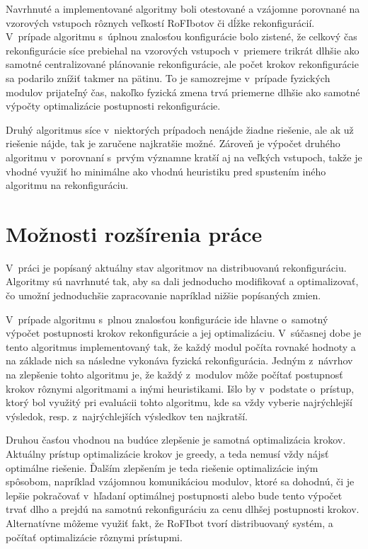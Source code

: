 \documentclass[
  printed, %
  oneside, %
  notable,   %
  nolof,     %
  nolot,     %
]{fithesis3}
\begin{document}
Navrhnuté a implementované algoritmy boli otestované a vzájomne porovnané na vzorových vstupoch rôznych veľkostí RoFIbotov či dĺžke rekonfigurácií. V~prípade algoritmu s~úplnou znalosťou konfigurácie bolo zistené, že celkový čas rekonfigurácie síce prebiehal na vzorových vstupoch v~priemere trikrát dlhšie ako samotné centralizované plánovanie rekonfigurácie, ale počet krokov rekonfigurácie sa podarilo znížiť takmer na pätinu. To je samozrejme v~prípade fyzických modulov prijateľný čas, nakoľko fyzická zmena trvá priemerne dlhšie ako samotné výpočty optimalizácie postupnosti rekonfigurácie. 

Druhý algoritmus síce v~niektorých prípadoch nenájde žiadne riešenie, ale ak už riešenie nájde, tak je zaručene najkratšie možné. Zároveň je výpočet druhého algoritmu v~porovnaní s~prvým významne kratší aj na veľkých vstupoch, takže je vhodné využiť ho minimálne ako vhodnú heuristiku pred spustením iného algoritmu na rekonfiguráciu. 

\section{Možnosti rozšírenia práce}
\label{sec:future}
V~práci je popísaný aktuálny stav algoritmov na distribuovanú rekonfiguráciu. Algoritmy sú navrhnuté tak, aby sa dali jednoducho modifikovať a optimalizovať, čo umožní jednoduchšie zapracovanie napríklad nižšie popísaných zmien. 

V~prípade algoritmu s~plnou znalosťou konfigurácie ide hlavne o~samotný výpočet postupnosti krokov rekonfigurácie a jej optimalizáciu. V~súčasnej dobe je tento algoritmus implementovaný tak, že každý modul počíta rovnaké hodnoty a na základe nich sa následne vykonáva fyzická rekonfigurácia. Jedným z~návrhov na zlepšenie tohto algoritmu je, že každý z~modulov môže počítať postupnosť krokov rôznymi algoritmami a inými heuristikami. Išlo by v~podstate o~prístup, ktorý bol využitý pri evaluácii tohto algoritmu, kde sa vždy vyberie najrýchlejší výsledok, resp. z~najrýchlejších výsledkov ten najkratší. 

Druhou časťou vhodnou na budúce zlepšenie je samotná optimalizácia krokov. Aktuálny prístup optimalizácie krokov je greedy, a teda nemusí vždy nájsť optimálne riešenie. Ďalším zlepšením je teda riešenie optimalizácie iným spôsobom, napríklad vzájomnou komunikáciou modulov, ktoré sa dohodnú, či je lepšie pokračovať v~hľadaní optimálnej postupnosti alebo bude tento výpočet trvať dlho a prejdú na samotnú rekonfiguráciu za cenu dlhšej postupnosti krokov. Alternatívne môžeme využiť fakt, že RoFIbot tvorí distribuovaný systém, a počítať optimalizácie rôznymi prístupmi. 
\end{document}

